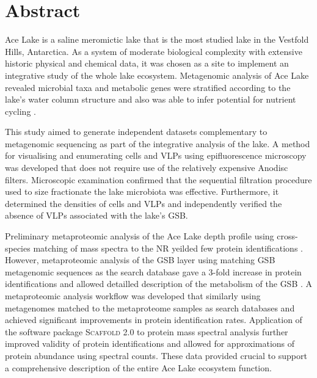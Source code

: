 \section{Abstract}
Ace Lake is a saline meromictic lake that is the most studied lake in the Vestfold Hills, Antarctica.
As a system of moderate biological complexity with extensive historic physical and chemical data, it was chosen as a site to implement an integrative study of the whole lake ecosystem.
Metagenomic analysis of Ace Lake revealed microbial taxa and metabolic genes were stratified according to the lake's water column structure and also was able to infer potential for nutrient cycling \cite{Lauro2011}.

This study aimed to generate independent datasets complementary to metagenomic sequencing as part of the integrative analysis of the lake.
A method for visualising and enumerating cells and \acp{VLP} using epifluorescence microscopy was developed that does not require use of the relatively expensive Anodisc filters.
Microscopic examination confirmed that the sequential filtration procedure used to size fractionate the lake microbiota was effective. 
Furthermore, it determined the densities of cells and \acp{VLP} and independently verified the absence of \acp{VLP} associated with the lake's \ac{GSB}.

Preliminary metaproteomic analysis of the Ace Lake depth profile using cross-species matching of mass spectra to the \ac{NR} yeilded few protein identifications \cite{Ng2010b}.
However, metaproteomic analysis of the \ac{GSB} layer using matching \ac{GSB} metagenomic sequences as the search database gave a 3-fold increase in protein identifications and allowed detailled description of the metabolism of the \ac{GSB} \cite{Ng2010a,Ng2010b}.
A metaproteomic analysis workflow was developed that similarly using metagenomes matched to the metaproteome samples as search databases and achieved significant improvements in protein identification rates.
Application of the software package \textsc{Scaffold} 2.0 to protein mass spectral analysis further improved validity of protein identifications and allowed for approximations of protein abundance using spectral counts.
These data provided crucial to support a comprehensive description of the  entire Ace Lake ecosystem function. 

